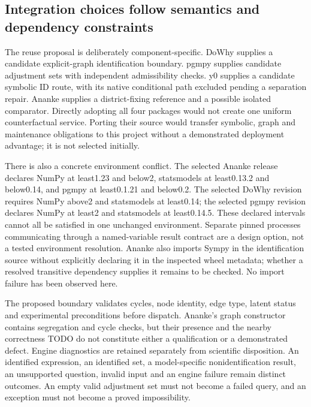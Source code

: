 \subsection{Integration choices follow semantics and dependency constraints}
\label{exec18:pyid-integration}

The reuse proposal is deliberately component-specific. DoWhy supplies a
candidate explicit-graph identification boundary. pgmpy supplies candidate
adjustment sets with independent admissibility checks. y0 supplies a candidate
symbolic ID route, with its native conditional path excluded pending a
separation repair. Ananke supplies a district-fixing reference and a possible
isolated comparator. Directly adopting all four packages would not create one
uniform counterfactual service. Porting their source would transfer symbolic,
graph and maintenance obligations to this project without a demonstrated
deployment advantage; it is not selected initially.
\citep{exec13_dowhy,exec13_pgmpy_reuse_primary,exec13_y0_id,exec18_pyid_one_line,exec18_pyid_contract}

There is also a concrete environment conflict. The selected Ananke release
declares NumPy at least1.23 and below2, statsmodels at least0.13.2 and below0.14,
and pgmpy at least0.1.21 and below0.2. The selected DoWhy revision requires
NumPy above2 and statsmodels at least0.14; the selected pgmpy revision declares
NumPy at least2 and statsmodels at least0.14.5. These declared intervals cannot
all be satisfied in one unchanged environment. Separate pinned processes
communicating through a named-variable result contract are a design option,
not a tested environment resolution. Ananke also imports Sympy in the
identification source without explicitly declaring it in the inspected wheel
metadata; whether a resolved transitive dependency supplies it remains to be
checked. No import failure has been observed here.
\citep{exec18_pyid_metadata,exec18_pyid_one_line,exec13_dowhy_project,exec13_pgmpy_reuse_primary}

The proposed boundary validates cycles, node identity, edge type, latent status
and experimental preconditions before dispatch. Ananke's graph constructor
contains segregation and cycle checks, but their presence and the nearby
correctness TODO do not constitute either a qualification or a demonstrated
defect. Engine diagnostics are retained separately from scientific disposition.
An identified expression, an identified set, a model-specific nonidentification
result, an unsupported question, invalid input and an engine failure remain
distinct outcomes. An empty valid adjustment set must not become a failed query,
and an exception must not become a proved impossibility.
\citep{exec18_pyid_graph,exec18_pyid_one_line,exec18_pyid_contract}

